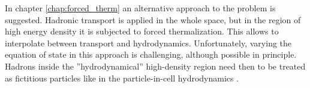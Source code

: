 In chapter \ref{chap:forced_therm} an alternative approach to the problem is
suggested. Hadronic transport is applied in the whole space, but in the region of
high energy density it is subjected to forced thermalization. This allows
to interpolate between transport and hydrodynamics. Unfortunately, varying
the equation of state in this approach is challenging, although possible in
principle. 	Hadrons inside the ''hydrodynamical'' high-density region
need then to be treated as fictitious particles like in the particle-in-cell
hydrodynamics \cite{Harlow:1976}.

